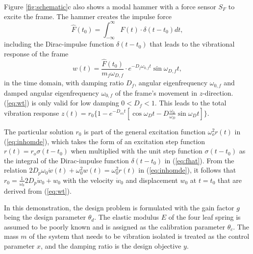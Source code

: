 \documentclass[10pt]{asme2ej}
\begin{document}
%
Figure \ref{fig:schematic}c also shows a modal hammer with a force sensor $S_F$ to excite the frame. 
%
The hammer creates the impulse force 
%
\begin{equation}\label{eq:fhat}
	\hat F(t_0)=\int_{-\infty}^\infty F(t)\cdot\delta(t-t_0)dt,
\end{equation}
%
including the Dirac-impulse function $\delta(t-t_0)$ that leads to the vibrational response of the
frame 
%
\begin{equation}\label{eq:wt}
	w(t) = \frac{\hat F(t_0)}{m_f\omega_{D,f}}\cdot e^{-D_f\omega_{0,f}t}\sin\omega_{D,f}t,
\end{equation}
%
in the time domain, with damping ratio $D_f$, angular eigenfrequency $\omega_{0,f}$ and damped
angular eigenfrequency $\omega_{0,f}$ of the frame’s movement in $z$-direction. 
%
(\ref{eq:wt}) is only valid for low damping $0 < D_f < 1$. This leads to the total vibration response $z(t)=r_0 \{1-e^{-D_{\omega_0}t}[\cos\omega_D t-D\frac{\omega_0}{\omega_D}\sin \omega_Dt]\}$.
%

%
The particular solution $r_0$ is part of the general excitation function $\omega_o^2r(t)$ in (\ref{eq:inhomde}), which takes the form of an excitation step function $r(t) = r_o\sigma(t-t_0)$ when multiplied with the unit step function $\sigma(t - t_0)$ as the integral of the Dirac-impulse
function $\delta(t - t_0)$ in (\ref{eq:fhat}). 
%
From the relation $2D_p\omega_0\dot w(t)+\omega_0^2w(t)=\omega_0^2r(t)$ in (\ref{eq:inhomde}),  it follows that $r_0=\frac1{\omega_0}2D_p\dot w_0+w_0$ with the velocity $\dot w_0$ and displacement $w_0$ at $t=t_0$ that are derived from (\ref{eq:wt}).
%

%
In this demonstration, the design problem is formulated with the gain factor $g$ being the design parameter $\theta_d$.
%
The elastic modulus $E$ of the four leaf spring is assumed to be poorly known and is assigned as the calibration parameter $\theta_c$.
%
The mass $m$ of the system that needs to be vibration isolated is treated as the control parameter $x$, and the damping ratio is the design objective $y$. 
%

%
\end{document}
